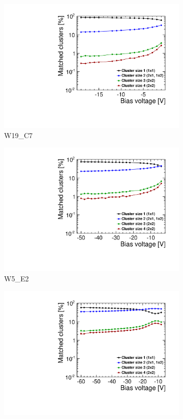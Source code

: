 \begin{figure}[htbp]
  \begin{subfigure}[b]{0.33\textwidth}
    \includegraphics[width=\textwidth]{./figures/TestBeam/cluSize_biasScan_W0019_C07.pdf}
    \caption{W19\_C7}
  \end{subfigure} \hfill
  \begin{subfigure}[b]{0.33\textwidth}
    \includegraphics[width=\textwidth]{./figures/TestBeam/cluSize_biasScan_W0005_E02.pdf}
    \caption{W5\_E2}
  \end{subfigure}\hfill
  \begin{subfigure}[b]{0.33\textwidth}
    \includegraphics[width=\textwidth]{./figures/TestBeam/cluSize_biasScan_W0005_F01.pdf}

\end{subfigure}
\end{figure}
